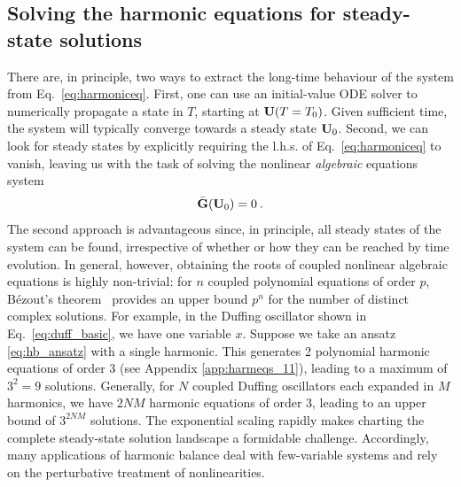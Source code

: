 \subsection{Solving the harmonic equations for steady-state solutions}\label{sec:hb_solving} 
There are, in principle, two ways to extract the long-time behaviour of the system from Eq.~\eqref{eq:harmoniceq}. First, one can use an initial-value ODE solver to numerically propagate a state in $T$, starting at $\vb{U}(T=T_0)$. Given sufficient time, the system will typically converge towards a steady state $\vb{U}_0$. Second, we can look for steady states by explicitly requiring the l.h.s. of Eq.~\eqref{eq:harmoniceq} to vanish, leaving us with the task of solving the nonlinear \textit{algebraic} equations system
%
\begin{equation}\label{eq:harmonic_balance}
\bar{\vb{G}} (\vb{U}_0) = 0\:.
\end{equation} 
%
The second approach is advantageous since, in principle, all steady states of the system can be found, irrespective of whether or how they can be reached by time evolution. In general, however, obtaining the roots of coupled nonlinear algebraic equations is highly non-trivial: for $n$ coupled polynomial equations of order $p$, B\'{e}zout's theorem~\cite{Cox_2013} provides an upper bound $p^n$ for the number of distinct complex solutions. For example, in the Duffing oscillator shown in Eq.~\eqref{eq:duff_basic}, we have one variable $x$. Suppose we take an ansatz \eqref{eq:hb_ansatz} with a single harmonic. This generates 2 polynomial harmonic equations of order 3 (see Appendix \ref{app:harmeqs_11}), leading to a maximum of $3^2=9$ solutions. Generally, for $N$ coupled Duffing oscillators each expanded in $M$ harmonics, we have $2NM$ harmonic equations of order 3, leading to an upper bound of $3^{2NM}$ solutions. The exponential scaling rapidly makes charting the complete steady-state solution landscape
a formidable challenge. Accordingly, many applications of harmonic balance deal with few-variable systems and rely on the perturbative treatment of nonlinearities.

